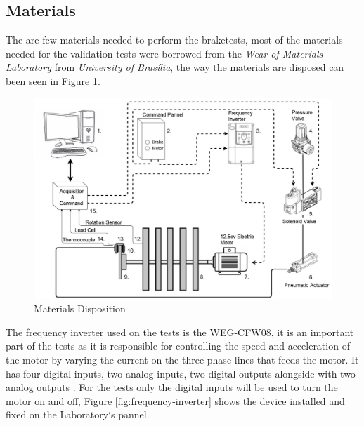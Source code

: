 \subsection{Materials}\label{sec:materials}
		The are few materials needed to perform the braketests, most of the materials needed for the validation tests were borrowed from the \textit{Wear of Materials Laboratory} from \textit{University of Brasília}, the way the materials are disposed can been seen in Figure \ref{fig:materials-scheme}.

		\begin{figure}[htbp]
			\centering
			\includegraphics[width=1\textwidth]{figuras/fig-materials-scheme}
			\caption{Materials Disposition}
			\label{fig:materials-scheme}
		\end{figure}

		\par
		The frequency inverter used on the tests is the WEG-CFW08, it is an important part of the tests as it is responsible for controlling the speed and acceleration of the motor by varying the current on the three-phase lines that feeds the motor. It has four digital inputs, two analog inputs, two digital outputs alongside with two analog outputs \cite{wegCFW08Manual}. For the tests only the digital inputs will be used to turn the motor on and off, Figure \ref{fig:frequency-inverter} shows the device installed and fixed on the Laboratory`s pannel.

